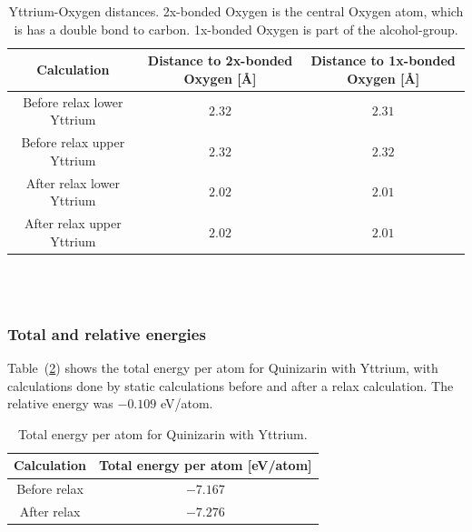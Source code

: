 \documentclass{article}
\begin{document}
      \begin{table}[H]
        \centering
        \caption{Yttrium-Oxygen distances. 2x-bonded Oxygen is the central Oxygen atom, which is has a double bond to carbon. 1x-bonded Oxygen is part of the alcohol-group. }
        \label{tab:neighborY}
        \begin{tabular}{|c|c|c|}
            \hline
            Calculation & Distance to 2x-bonded Oxygen [Å] & Distance to 1x-bonded Oxygen [Å]  \\
            \hline \hline
            Before relax lower Yttrium & $2.32$ & $2.31$ \\
            Before relax upper Yttrium & $2.32$ & $2.32$ \\
            After relax lower Yttrium & $2.02$ & $2.01$ \\
            After relax upper Yttrium & $2.02$ & $2.01$ \\
            \hline
        \end{tabular} \\
        \hspace{0pt}\\
      \end{table}

      \vspace{1cm}

    \subsubsection{Total and relative energies}

      Table~(\ref{tab:TOTENY}) shows the total energy per atom for Quinizarin with Yttrium, with calculations done by static calculations before and after a relax calculation. The relative energy was $-0.109$ eV/atom. \\

      \begin{table}[H]
        \centering
        \caption{Total energy per atom for Quinizarin with Yttrium. }
        \vspace{0mm}
        \label{tab:TOTENY}
        \begin{tabular}{|c|c|}
            \hline
            Calculation & Total energy per atom [eV/atom]  \\
            \hline \hline
            Before relax & $-7.167$ \\
            After relax & $-7.276$ \\
            \hline
        \end{tabular} \\
        \hspace{0pt}\\
      \end{table}
\end{document}
